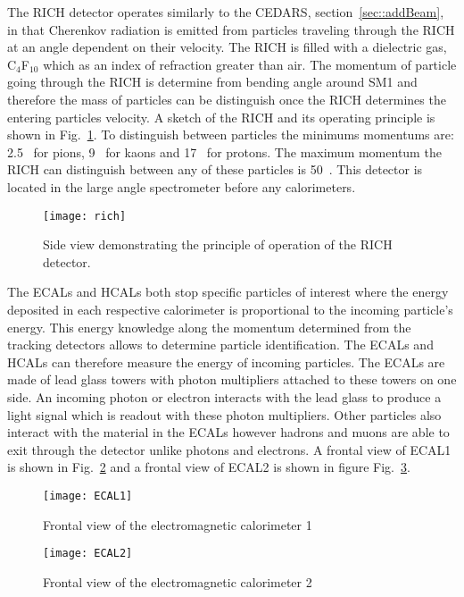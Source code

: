 The RICH detector operates similarly to the CEDARS, section~\ref{sec::addBeam},
in that Cherenkov radiation is emitted from particles traveling through the RICH
at an angle dependent on their velocity.  The RICH is filled with a dielectric
gas, C$_4$F$_{10}$ which as an index of refraction greater than air.  The
momentum of particle going through the RICH is determine from bending angle
around SM1 and therefore the mass of particles can be distinguish once the RICH
determines the entering particles velocity.  A sketch of the RICH and its
operating principle is shown in Fig.~\ref{fig::rich}.  To distinguish between
particles the minimums momentums are: 2.5~{\gvc} for pions, 9~{\gvc} for kaons
and 17~{\gvc} for protons.  The maximum momentum the RICH can distinguish
between any of these particles is 50~{\gvc}. This detector is located in the
large angle spectrometer before any calorimeters.\par

\begin{figure}[h!t]
  \centering
  \texttt{[image: rich]}
  \caption{Side view demonstrating the principle of operation of the RICH
    detector.}
  \label{fig::rich}
\end{figure}

The ECALs and HCALs both stop specific particles of interest where the energy
deposited in each respective calorimeter is proportional to the incoming
particle's energy.  This energy knowledge along the momentum determined from the
tracking detectors allows to determine particle identification.  The ECALs and
HCALs can therefore measure the energy of incoming particles.  The ECALs are
made of lead glass towers with photon multipliers attached to these towers on
one side.  An incoming photon or electron interacts with the lead glass to
produce a light signal which is readout with these photon multipliers.  Other
particles also interact with the material in the ECALs however hadrons and muons
are able to exit through the detector unlike photons and electrons.  A frontal
view of ECAL1 is shown in Fig.~\ref{fig::ECAL1} and a frontal view of ECAL2 is
shown in figure Fig.~\ref{fig::ECAL2}. \par

\begin{figure}[h!t]
  \centering
  \texttt{[image: ECAL1]}
  \caption{Frontal view of the electromagnetic calorimeter 1}
  \label{fig::ECAL1}
\end{figure}

\begin{figure}[h!t]
  \centering
  \texttt{[image: ECAL2]}
  \caption{Frontal view of the electromagnetic calorimeter 2}
  \label{fig::ECAL2}
\end{figure}


